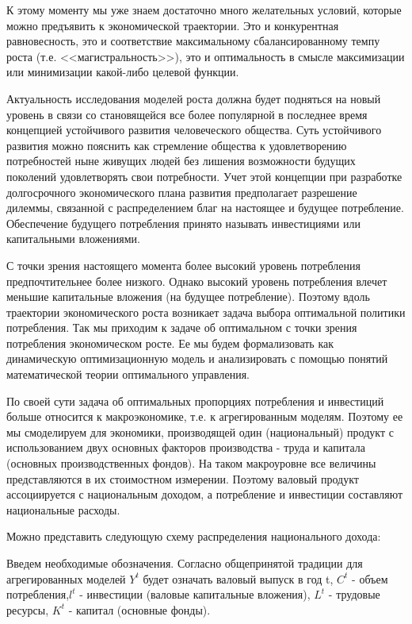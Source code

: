\documentclass[12pt, 4paper]{book}
\begin{document}
{К этому моменту мы уже знаем достаточно много желательных условий, которые можно предъявить к экономической траектории. Это и конкурентная равновесность, это и соответствие максимальному сбалансированному темпу роста (т.е. <<магистральность>>), это и оптимальность в смысле максимизации или минимизации какой-либо целевой функции.
\par

Актуальность исследования моделей роста должна будет подняться на новый уровень в связи со становящейся все более популярной в последнее время концепцией устойчивого развития человеческого общества. Суть устойчивого развития можно пояснить как стремление общества к удовлетворению потребностей ныне живущих людей без лишения возможности будущих поколений удовлетворять свои потребности. Учет этой концепции при разработке долгосрочного экономического плана развития предполагает разрешение дилеммы, связанной с распределением благ на настоящее и будущее потребление. Обеспечение будущего потребления принято называть инвестициями или капитальными вложениями.
\par

С точки зрения настоящего момента более высокий уровень потребления предпочтительнее более низкого. Однако высокий уровень потребления влечет меньшие капитальные вложения (на будущее потребление). Поэтому вдоль траектории экономического роста возникает задача выбора оптимальной политики потребления. Так мы приходим к задаче об оптимальном с точки зрения потребления экономическом росте. Ее мы будем формализовать как динамическую оптимизационную модель и анализировать с помощью понятий математической теории оптимального управления.
\par

По своей сути задача об оптимальных пропорциях потребления и инвестиций больше относится к макроэкономике, т.е. к агрегированным моделям. Поэтому ее мы смоделируем для экономики, производящей один (национальный) продукт с использованием двух основных факторов производства - труда и капитала (основных производственных фондов). На таком макроуровне все величины представляются в их стоимостном измерении. Поэтому валовый продукт ассоциируется с национальным доходом, а потребление и инвестиции составляют национальные расходы.
\par

Можно представить следующую схему распределения национального дохода:
\par

Введем необходимые обозначения. Согласно общепринятой традиции для агрегированных моделей $Y^t$ будет означать валовый выпуск в год t, $C^t$ - объем потребления,$l^t$  - инвестиции (валовые капитальные вложения), $L^t$ - трудовые ресурсы, $K^t$ - капитал (основные фонды).
\par

}
\end{document}

